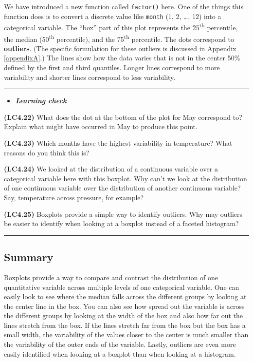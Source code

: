 \documentclass[]{tufte-book}
\let\oldrule=\rule
\renewcommand{\rule}[1]{\oldrule{\linewidth}}
\newenvironment{rmdblock}[1]
  {\begin{shaded*}
  \begin{itemize}
  \renewcommand{\labelitemi}{
    \raisebox{-.7\height}[0pt][0pt]{
    }
  }
  \item
  }
  {
  \end{itemize}
  \end{shaded*}
  }
\newenvironment{learncheck}
  {\begin{rmdblock}{warning}}
  {\end{rmdblock}}
\theoremstyle{definition}
\theoremstyle{definition}
\theoremstyle{remark}
\begin{document}
We have introduced a new function called \texttt{factor()} here. One of
the things this function does is to convert a discrete value like
\texttt{month} (1, 2, \ldots{}, 12) into a categorical variable. The
``box'' part of this plot represents the 25\textsuperscript{th}
percentile, the median (50\textsuperscript{th} percentile), and the
75\textsuperscript{th} percentile. The dots correspond to
\textbf{outliers}. (The specific formulation for these outliers is
discussed in Appendix \ref{appendixA}.) The lines show how the data
varies that is not in the center 50\% defined by the first and third
quantiles. Longer lines correspond to more variability and shorter lines
correspond to less variability.

\begin{center}\rule{0.5\linewidth}{\linethickness}\end{center}

\begin{learncheck}
\textbf{\emph{Learning check}}
\end{learncheck}

\textbf{(LC4.22)} What does the dot at the bottom of the plot for May
correspond to? Explain what might have occurred in May to produce this
point.

\textbf{(LC4.23)} Which months have the highest variability in
temperature? What reasons do you think this is?

\textbf{(LC4.24)} We looked at the distribution of a continuous variable
over a categorical variable here with this boxplot. Why can't we look at
the distribution of one continuous variable over the distribution of
another continuous variable? Say, temperature across pressure, for
example?

\textbf{(LC4.25)} Boxplots provide a simple way to identify outliers.
Why may outliers be easier to identify when looking at a boxplot instead
of a faceted histogram?

\begin{center}\rule{0.5\linewidth}{\linethickness}\end{center}

\subsection{Summary}\label{summary-3}

Boxplots provide a way to compare and contrast the distribution of one
quantitative variable across multiple levels of one categorical
variable. One can easily look to see where the median falls across the
different groups by looking at the center line in the box. You can also
see how spread out the variable is across the different groups by
looking at the width of the box and also how far out the lines stretch
from the box. If the lines stretch far from the box but the box has a
small width, the variability of the values closer to the center is much
smaller than the variability of the outer ends of the variable. Lastly,
outliers are even more easily identified when looking at a boxplot than
when looking at a histogram.
\end{document}
